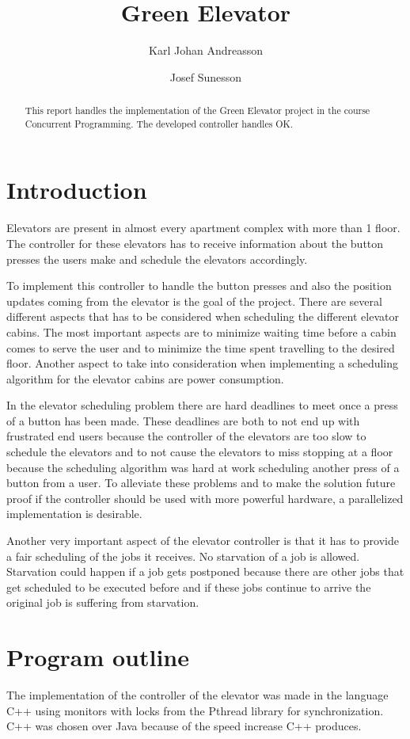 \documentclass[10pt,a4paper]{article}
\author{Karl Johan Andreasson \and Josef Sunesson}
\title{Green Elevator}
\begin{document}
\maketitle

\begin{abstract} 
This report handles the implementation of the Green Elevator project in the course Concurrent Programming. The developed controller handles OK.
\end{abstract}

\section{Introduction}
Elevators are present in almost every apartment complex with more than 1 floor. The controller for these elevators has to receive information about the button presses the users make and schedule the elevators accordingly.

To implement this controller to handle the button presses and also the position updates coming from the elevator is the goal of the project. There are several different aspects that has to be considered when scheduling the different elevator cabins. The most important aspects are to minimize waiting time before a cabin comes to serve the user and to minimize the time spent travelling to the desired floor. Another aspect to take into consideration when implementing a scheduling algorithm for the elevator cabins are power consumption.

In the elevator scheduling problem there are hard deadlines to meet once a press of a button has been made. These deadlines are both to not end up with frustrated end users because the controller of the elevators are too slow to schedule the elevators and to not cause the elevators to miss stopping at a floor because the scheduling algorithm was hard at work scheduling another press of a button from a user. To alleviate these problems and to make the solution future proof if the controller should be used with more powerful hardware, a parallelized implementation is desirable.

Another very important aspect of the elevator controller is that it has to provide a fair scheduling of the jobs it receives. No starvation of a job is allowed. Starvation could happen if a job gets postponed because there are other jobs that get scheduled to be executed before and if these jobs continue to arrive the original job is suffering from starvation.

\section{Program outline}
The implementation of the controller of the elevator was made in the language C++ using monitors with locks from the Pthread library for synchronization. C++ was chosen over Java because of the speed increase C++ produces.
\end{document}
